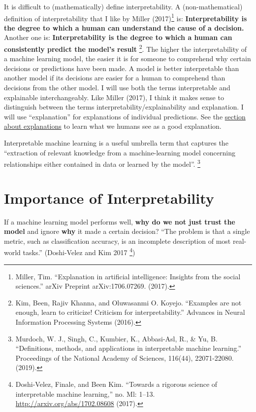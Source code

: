 \documentclass[
  10pt,
]{scrbook}
\begin{document}
It is difficult to (mathematically) define interpretability.
A (non-mathematical) definition of interpretability that I like by Miller (2017)\footnote{Miller, Tim. ``Explanation in artificial intelligence: Insights from the social sciences.'' arXiv Preprint arXiv:1706.07269. (2017).} is:
\textbf{Interpretability is the degree to which a human can understand the cause of a decision.}
Another one is:
\textbf{Interpretability is the degree to which a human can consistently predict the model's result} \footnote{Kim, Been, Rajiv Khanna, and Oluwasanmi O. Koyejo. ``Examples are not enough, learn to criticize! Criticism for interpretability.'' Advances in Neural Information Processing Systems (2016).}.
The higher the interpretability of a machine learning model, the easier it is for someone to comprehend why certain decisions or predictions have been made.
A model is better interpretable than another model if its decisions are easier for a human to comprehend than decisions from the other model.
I will use both the terms interpretable and explainable interchangeably.
Like Miller (2017), I think it makes sense to distinguish between the terms interpretability/explainability and explanation.
I will use ``explanation'' for explanations of individual predictions.
See the \protect\hyperlink{explanation}{section about explanations} to learn what we humans see as a good explanation.

Interpretable machine learning is a useful umbrella term that captures the ``extraction of relevant knowledge from a machine-learning model concerning relationships either contained in data or learned by the model''. \footnote{Murdoch, W. J., Singh, C., Kumbier, K., Abbasi-Asl, R., \& Yu, B. ``Definitions, methods, and applications in interpretable machine learning.'' Proceedings of the National Academy of Sciences, 116(44), 22071-22080. (2019).}

\hypertarget{interpretability-importance}{%
\section{Importance of Interpretability}\label{interpretability-importance}}

If a machine learning model performs well, \textbf{why do we not just trust the model} and ignore \textbf{why} it made a certain decision?
``The problem is that a single metric, such as classification accuracy, is an incomplete description of most real-world tasks.'' (Doshi-Velez and Kim 2017 \footnote{Doshi-Velez, Finale, and Been Kim. ``Towards a rigorous science of interpretable machine learning,'' no. Ml: 1--13. \url{http://arxiv.org/abs/1702.08608} (2017).})
\end{document}
